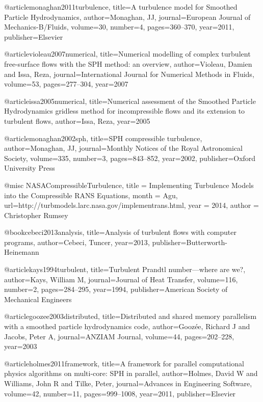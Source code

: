 @article{monaghan2011turbulence,
  title={A turbulence model for Smoothed Particle Hydrodynamics},
  author={Monaghan, JJ},
  journal={European Journal of Mechanics-B/Fluids},
  volume={30},
  number={4},
  pages={360--370},
  year={2011},
  publisher={Elsevier}
}

@article{violeau2007numerical,
  title={Numerical modelling of complex turbulent free-surface flows with the SPH method: an overview},
  author={Violeau, Damien and Issa, Reza},
  journal={International Journal for Numerical Methods in Fluids},
  volume={53},
  pages={277--304},
  year={2007}
}

@article{issa2005numerical,
  title={Numerical assessment of the Smoothed Particle Hydrodynamics gridless method for incompressible flows and its extension to turbulent flows},
  author={Issa, Reza},
  year={2005}
}

@article{monaghan2002sph,
  title={SPH compressible turbulence},
  author={Monaghan, JJ},
  journal={Monthly Notices of the Royal Astronomical Society},
  volume={335},
  number={3},
  pages={843--852},
  year={2002},
  publisher={Oxford University Press}
}


@misc {NASACompressibleTurbulence,
	title = {Implementing Turbulence Models into the Compressible RANS Equations},
	month = {Agu},
	url={http://turbmodels.larc.nasa.gov/implementrans.html},
	year = {2014},
	author = {Christopher Rumsey}
}

@book{cebeci2013analysis,
  title={Analysis of turbulent flows with computer programs},
  author={Cebeci, Tuncer},
  year={2013},
  publisher={Butterworth-Heinemann}
}

@article{kays1994turbulent,
  title={Turbulent Prandtl number—where are we?},
  author={Kays, William M},
  journal={Journal of Heat Transfer},
  volume={116},
  number={2},
  pages={284--295},
  year={1994},
  publisher={American Society of Mechanical Engineers}
}


@article{goozee2003distributed,
  title={Distributed and shared memory parallelism with a smoothed particle hydrodynamics code},
  author={Gooz{\'e}e, Richard J and Jacobs, Peter A},
  journal={ANZIAM Journal},
  volume={44},
  pages={202--228},
  year={2003}
}

@article{holmes2011framework,
  title={A framework for parallel computational physics algorithms on multi-core: SPH in parallel},
  author={Holmes, David W and Williams, John R and Tilke, Peter},
  journal={Advances in Engineering Software},
  volume={42},
  number={11},
  pages={999--1008},
  year={2011},
  publisher={Elsevier}
}

